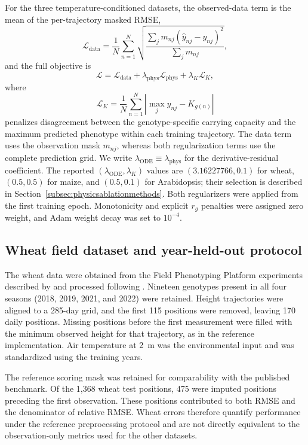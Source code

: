 \documentclass[preprint,12pt,authoryear]{elsarticle}
\begin{document}
For the three temperature-conditioned datasets, the observed-data term is the mean of the per-trajectory masked RMSE,
\begin{equation}
 \mathcal L_{\mathrm{data}}
 =\frac{1}{N}\sum_{n=1}^{N}
 \sqrt{\frac{\sum_j m_{nj}(\hat y_{nj}-y_{nj})^2}
 {\sum_j m_{nj}}},
 \label{eq:data_loss}
\end{equation}
and the full objective is
\begin{equation}
 \mathcal L=\mathcal L_{\mathrm{data}}
 +\lambda_{\mathrm{phys}}\mathcal L_{\mathrm{phys}}
 +\lambda_K\mathcal L_K,
 \label{eq:loss}
\end{equation}
where
\begin{equation}
 \mathcal L_K
 =\frac{1}{N}\sum_{n=1}^{N}
 \left|\max_j\hat y_{nj}-K_{g(n)}\right|
\end{equation}
penalizes disagreement between the genotype-specific carrying capacity and the maximum predicted phenotype within each training trajectory. The data term uses the observation mask $m_{nj}$, whereas both regularization terms use the complete prediction grid. We write $\lambda_{\mathrm{ODE}}\equiv\lambda_{\mathrm{phys}}$ for the derivative-residual coefficient. The reported $(\lambda_{\mathrm{ODE}},\lambda_K)$ values are $(3.16227766,0.1)$ for wheat, $(0.5,0.5)$ for maize, and $(0.5,0.1)$ for Arabidopsis; their selection is described in Section~\ref{subsec:physicsablationmethods}. Both regularizers were applied from the first training epoch. Monotonicity and explicit $r_g$ penalties were assigned zero weight, and Adam weight decay was set to $10^{-4}$.

\subsection{Wheat field dataset and year-held-out protocol}
\label{subsec:wheatdata}

The wheat data were obtained from the Field Phenotyping Platform experiments described by \citet{roth2024thermal} and processed following \citet{shao2026pinn}. Nineteen genotypes present in all four seasons (2018, 2019, 2021, and 2022) were retained. Height trajectories were aligned to a 285-day grid, and the first 115 positions were removed, leaving 170 daily positions. Missing positions before the first measurement were filled with the minimum observed height for that trajectory, as in the reference implementation. Air temperature at 2~m was the environmental input and was standardized using the training years.

The reference scoring mask was retained for comparability with the published benchmark. Of the 1,368 wheat test positions, 475 were imputed positions preceding the first observation. These positions contributed to both RMSE and the denominator of relative RMSE. Wheat errors therefore quantify performance under the reference preprocessing protocol and are not directly equivalent to the observation-only metrics used for the other datasets.
\end{document}
